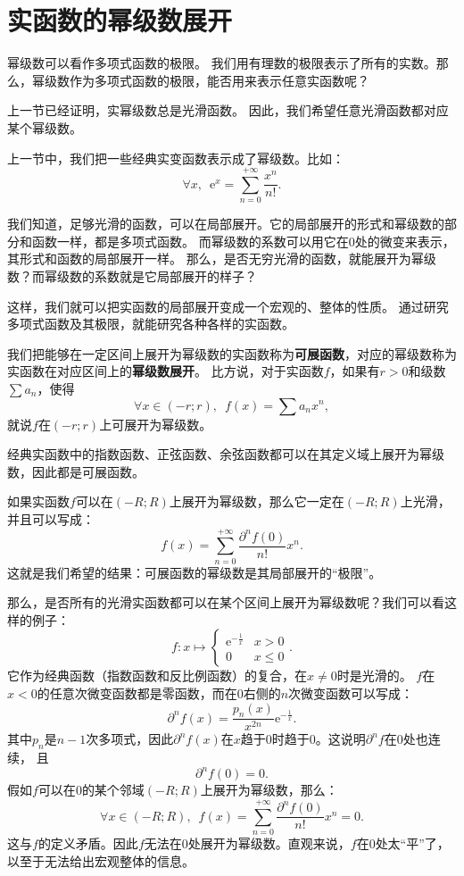 \documentclass[12pt,UTF8]{ctexbook}
\begin{document}
\section{实函数的幂级数展开}

幂级数可以看作多项式函数的极限。
我们用有理数的极限表示了所有的实数。那么，幂级数作为多项式函数的极限，能否用来表示任意实函数呢？

上一节已经证明，实幂级数总是光滑函数。
因此，我们希望任意光滑函数都对应某个幂级数。

上一节中，我们把一些经典实变函数表示成了幂级数。比如：
$$ \forall x, \,\,\, \mathrm{e}^x = \sum_{n=0}^{+\infty} \frac{x^n}{n!}. $$

我们知道，足够光滑的函数，可以在局部展开。它的局部展开的形式和幂级数的部分和函数一样，都是多项式函数。
而幂级数的系数可以用它在$0$处的微变来表示，其形式和函数的局部展开一样。
那么，是否无穷光滑的函数，就能展开为幂级数？而幂级数的系数就是它局部展开的样子？

这样，我们就可以把实函数的局部展开变成一个宏观的、整体的性质。
通过研究多项式函数及其极限，就能研究各种各样的实函数。

我们把能够在一定区间上展开为幂级数的实函数称为\textbf{可展函数}，对应的幂级数称为实函数在对应区间上的\textbf{幂级数展开}。
比方说，对于实函数$f$，如果有$r>0$和级数$\sum a_n$，使得
$$\forall x\in (-r;r),\,\,\, f(x) = \sum a_n x^n,$$
就说$f$在$(-r;r)$上可展开为幂级数。

经典实函数中的指数函数、正弦函数、余弦函数都可以在其定义域上展开为幂级数，因此都是可展函数。

如果实函数$f$可以在$(-R;R)$上展开为幂级数，那么它一定在$(-R;R)$上光滑，并且可以写成：
$$ f(x) = \sum_{n=0}^{+\infty} \frac{\partial^n f(0)}{n!} x^n. $$
这就是我们希望的结果：可展函数的幂级数是其局部展开的“极限”。

那么，是否所有的光滑实函数都可以在某个区间上展开为幂级数呢？我们可以看这样的例子：
$$ f: x\mapsto \begin{cases} \mathrm{e}^{-\frac{1}{x}} & x > 0 \\ 0 & x \leqslant 0 \end{cases}.$$
它作为经典函数（指数函数和反比例函数）的复合，在$x\neq 0$时是光滑的。
$f$在$x<0$的任意次微变函数都是零函数，而在$0$右侧的$n$次微变函数可以写成：
$$ \partial^n f(x) = \frac{p_n(x)}{x^{2n}} \mathrm{e}^{-\frac{1}{x}}.$$
其中$p_n$是$n-1$次多项式，因此$\partial^n f(x)$在$x$趋于$0$时趋于$0$。这说明$\partial^n f$在$0$处也连续，
且
$$ \partial^n f(0) = 0.$$
假如$f$可以在$0$的某个邻域$(-R;R)$上展开为幂级数，那么：
$$ \forall x \in (-R;R) ,\,\,\, f(x) = \sum_{n=0}^{+\infty} \frac{\partial^n f(0)}{n!} x^n = 0. $$
这与$f$的定义矛盾。因此$f$无法在$0$处展开为幂级数。直观来说，$f$在$0$处太“平”了，以至于无法给出宏观整体的信息。
\end{document}
